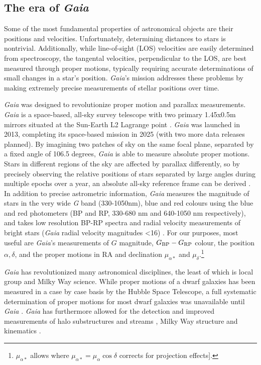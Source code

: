 \subsection{\texorpdfstring{The era of
\emph{Gaia}}{The era of Gaia}}\label{the-era-of-gaia}

Some of the most fundamental properties of astronomical objects are
their positions and velocities. Unfortunately, determining distances to
stars is nontrivial. Additionally, while line-of-sight (LOS) velocities
are easily determined from spectroscopy, the tangental velocities,
perpendicular to the LOS, are best measured through proper motions,
typically requiring accurate determinations of small changes in a star's
position. \emph{Gaia}'s mission addresses these problems by making
extremely precise measurements of stellar positions over time.

\emph{Gaia} was designed to revolutionize proper motion and parallax
measurements. \emph{Gaia} is a space-based, all-sky survey telescope
with two primary 1.45x0.5m mirrors situated at the Sun-Earth L2 Lagrange
point \citep{gaiacollaboration+2016}. \emph{Gaia} was launched in 2013,
completing its space-based mission in 2025 (with two more data releases
planned). By imagining two patches of sky on the same focal plane,
separated by a fixed angle of 106.5 degrees, \emph{Gaia} is able to
measure absolute proper motions. Stars in different regions of the sky
are affected by parallax differently, so by precisely observing the
relative positions of stars separated by large angles during multiple
epochs over a year, an absolute all-sky reference frame can be derived
\citep{gaiacollaboration+2016}. In addition to precise astrometric
information, \emph{Gaia} measures the magnitude of stars in the very
wide \emph{G} band (330-1050nm), blue and red colours using the blue and
red photometers (BP and RP, 330-680 nm and 640-1050 nm respectively),
and takes low resolution BP-RP spectra and radial velocity measurements
of bright stars (\emph{Gaia} radial velocity magnitudes \textless16)
\citep{gaiacollaboration+2016}. For our purposes, most useful are
\emph{Gaia}'s measurements of \(G\) magnitude,
\(G_{\rm BP} - G_{\rm RP}\) colour, the position \(\alpha, \delta\), and
the proper motions in RA and declination \(\mu_{\alpha*}\) and
\(\mu_\delta\).\footnote{\(\mu_{\alpha*}\) allows where
  \(\mu_{\alpha*} = \mu_\alpha \cos \delta\) corrects for projection
  effects{]}.}

\emph{Gaia} has revolutionized many astronomical disciplines, the least
of which is local group and Milky Way science. While proper motions of a
dwarf galaxies has been measured in a case by case basis by the Hubble
Space Telescope, a full systematic determination of proper motions for
most dwarf galaxies was unavailable until \emph{Gaia}
\citep{MV2020a, battaglia+2022}. \emph{Gaia} has furthermore allowed for
the detection and improved measurements of halo substructures and
streams \citep{bonaca+price-whelan2025}, Milky Way structure and
kinematics \citep{hunt+vasiliev2025}.

